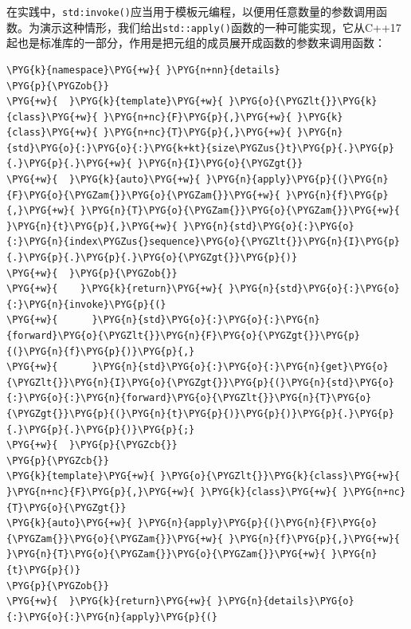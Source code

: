 \begin{itemize}
\end{itemize}



在实践中，\texttt{std:\allowbreak{}invoke()}应当用于模板元编程，以便用任意数量的参数调用函数。为演示这种情形，我们给出\texttt{std::\allowbreak{}apply()}函数的一种可能实现，它从C++17起也是标准库的一部分，作用是把元组的成员展开成函数的参数来调用函数：



\begin{codeblockbg}
\begin{Verbatim}[commandchars=\\\{\},breaklines=true,breakanywhere=true,fontsize=\codefont,xleftmargin=17bp]
\PYG{k}{namespace}\PYG{+w}{ }\PYG{n+nn}{details}
\PYG{p}{\PYGZob{}}
\PYG{+w}{  }\PYG{k}{template}\PYG{+w}{ }\PYG{o}{\PYGZlt{}}\PYG{k}{class}\PYG{+w}{ }\PYG{n+nc}{F}\PYG{p}{,}\PYG{+w}{ }\PYG{k}{class}\PYG{+w}{ }\PYG{n+nc}{T}\PYG{p}{,}\PYG{+w}{ }\PYG{n}{std}\PYG{o}{:}\PYG{o}{:}\PYG{k+kt}{size\PYGZus{}t}\PYG{p}{.}\PYG{p}{.}\PYG{p}{.}\PYG{+w}{ }\PYG{n}{I}\PYG{o}{\PYGZgt{}}
\PYG{+w}{  }\PYG{k}{auto}\PYG{+w}{ }\PYG{n}{apply}\PYG{p}{(}\PYG{n}{F}\PYG{o}{\PYGZam{}}\PYG{o}{\PYGZam{}}\PYG{+w}{ }\PYG{n}{f}\PYG{p}{,}\PYG{+w}{ }\PYG{n}{T}\PYG{o}{\PYGZam{}}\PYG{o}{\PYGZam{}}\PYG{+w}{ }\PYG{n}{t}\PYG{p}{,}\PYG{+w}{ }\PYG{n}{std}\PYG{o}{:}\PYG{o}{:}\PYG{n}{index\PYGZus{}sequence}\PYG{o}{\PYGZlt{}}\PYG{n}{I}\PYG{p}{.}\PYG{p}{.}\PYG{p}{.}\PYG{o}{\PYGZgt{}}\PYG{p}{)}
\PYG{+w}{  }\PYG{p}{\PYGZob{}}
\PYG{+w}{    }\PYG{k}{return}\PYG{+w}{ }\PYG{n}{std}\PYG{o}{:}\PYG{o}{:}\PYG{n}{invoke}\PYG{p}{(}
\PYG{+w}{      }\PYG{n}{std}\PYG{o}{:}\PYG{o}{:}\PYG{n}{forward}\PYG{o}{\PYGZlt{}}\PYG{n}{F}\PYG{o}{\PYGZgt{}}\PYG{p}{(}\PYG{n}{f}\PYG{p}{)}\PYG{p}{,}
\PYG{+w}{      }\PYG{n}{std}\PYG{o}{:}\PYG{o}{:}\PYG{n}{get}\PYG{o}{\PYGZlt{}}\PYG{n}{I}\PYG{o}{\PYGZgt{}}\PYG{p}{(}\PYG{n}{std}\PYG{o}{:}\PYG{o}{:}\PYG{n}{forward}\PYG{o}{\PYGZlt{}}\PYG{n}{T}\PYG{o}{\PYGZgt{}}\PYG{p}{(}\PYG{n}{t}\PYG{p}{)}\PYG{p}{)}\PYG{p}{.}\PYG{p}{.}\PYG{p}{.}\PYG{p}{)}\PYG{p}{;}
\PYG{+w}{  }\PYG{p}{\PYGZcb{}}
\PYG{p}{\PYGZcb{}}
\PYG{k}{template}\PYG{+w}{ }\PYG{o}{\PYGZlt{}}\PYG{k}{class}\PYG{+w}{ }\PYG{n+nc}{F}\PYG{p}{,}\PYG{+w}{ }\PYG{k}{class}\PYG{+w}{ }\PYG{n+nc}{T}\PYG{o}{\PYGZgt{}}
\PYG{k}{auto}\PYG{+w}{ }\PYG{n}{apply}\PYG{p}{(}\PYG{n}{F}\PYG{o}{\PYGZam{}}\PYG{o}{\PYGZam{}}\PYG{+w}{ }\PYG{n}{f}\PYG{p}{,}\PYG{+w}{ }\PYG{n}{T}\PYG{o}{\PYGZam{}}\PYG{o}{\PYGZam{}}\PYG{+w}{ }\PYG{n}{t}\PYG{p}{)}
\PYG{p}{\PYGZob{}}
\PYG{+w}{  }\PYG{k}{return}\PYG{+w}{ }\PYG{n}{details}\PYG{o}{:}\PYG{o}{:}\PYG{n}{apply}\PYG{p}{(}

\end{Verbatim}
\end{codeblockbg}
